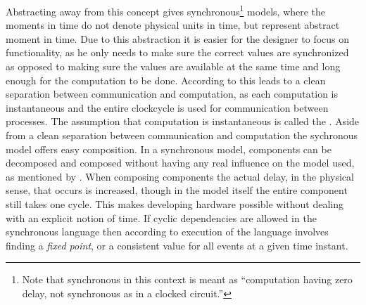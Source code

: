Abstracting away from this concept gives synchronous\footnote{Note that synchronous in this context is meant as ``computation having zero delay, not synchronous as in a clocked circuit.''} models, where the moments in time do not denote physical units in time, but represent abstract moment in time. 
Due to this abstraction it is easier for the designer to focus on functionality, as he only needs to make sure the correct values are synchronized as opposed to making sure the values are available at the same time and long enough for the computation to be done.
According to \cite{jantsch2005models} this leads to a clean separation between communication and computation, as each computation is instantaneous and the entire clockcycle is used for communication between processes. 
The assumption that computation is instantaneous is called the .
Aside from a clean separation between communication and computation the sychronous model offers easy composition.
In a synchronous model, components can be decomposed and composed without having any real influence on the model used, as mentioned by \cite{benveniste1991synchronous}.
When composing components the actual delay, in the physical sense, that occurs is increased, though in the model itself the entire component still takes one cycle. 
This makes developing hardware possible without dealing with an explicit notion of time.
If cyclic dependencies are allowed in the synchronous language then according to \cite{chang1997heterogeneous} execution of the language involves finding a \textit{fixed point}, or a consistent value for all events at a given time instant.

